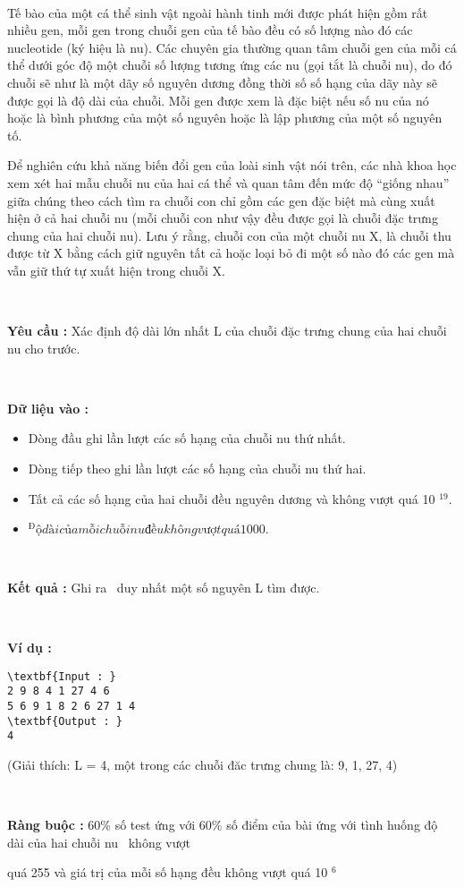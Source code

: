 

 

Tế bào của một cá thể sinh vật ngoài hành tinh mới được phát hiện gồm rất nhiều gen, mỗi gen trong chuỗi gen của tế bào đều có số lượng nào đó các nucleotide (ký hiệu là nu). Các chuyên gia thường quan tâm chuỗi gen của mỗi cá thể dưới góc độ một chuỗi số lượng tương ứng các nu (gọi tắt là chuỗi nu), do đó chuỗi sẽ như là một dãy số nguyên dương đồng thời số số hạng của dãy này sẽ được gọi là độ dài của chuỗi. Mỗi gen được xem là đặc biệt nếu số nu của nó hoặc là bình phương của một số nguyên hoặc là lập phương của một số nguyên tố.

Để nghiên cứu khả năng biến đổi gen của loài sinh vật nói trên, các nhà khoa học xem xét hai mẫu chuỗi nu của hai cá thể và quan tâm đến mức độ “giống nhau” giữa chúng theo cách tìm ra chuỗi con chỉ gồm các gen đặc biệt mà cùng xuất hiện ở cả hai chuỗi nu (mỗi chuỗi con như vậy đều được gọi là chuỗi đặc trưng chung của hai chuỗi nu). Lưu ý rằng, chuỗi con của một chuỗi nu X, là chuỗi thu được từ X bằng cách giữ nguyên tất cả hoặc loại bỏ đi một số nào đó các gen mà vẫn giữ thứ tự xuất hiện trong chuỗi X.

 

\textbf{Yêu cầu : } Xác định độ dài lớn nhất L của chuỗi đặc trưng chung của hai chuỗi nu cho trước.

 

\textbf{Dữ liệu vào : }
\begin{itemize}
	\item Dòng đầu ghi lần lượt các số hạng của chuỗi nu thứ nhất.
	\item Dòng tiếp theo ghi lần lượt các số hạng của chuỗi nu thứ hai.
	\item Tất cả các số hạng của hai chuỗi đều nguyên dương và không vượt quá 10 $^ 19. $
	\item $^Độ dài của mỗi chuỗi nu đều không vượt quá 1000.$
\end{itemize}

 

\textbf{Kết quả : } Ghi ra  duy nhất một số nguyên L tìm được.

 

\textbf{Ví dụ : }
\begin{verbatim}
\textbf{Input : }
2 9 8 4 1 27 4 6
5 6 9 1 8 2 6 27 1 4
\textbf{Output : }
4\end{verbatim}

(Giải thích: L = 4, một trong các chuỗi đăc trưng chung là: 9, 1, 27, 4)

 

\textbf{Ràng buộc : } 60\% số test ứng với 60\% số điểm của bài ứng với tình huống độ dài của hai chuỗi nu  không vượt

quá 255 và giá trị của mỗi số hạng đều không vượt quá 10 $^ 6 $